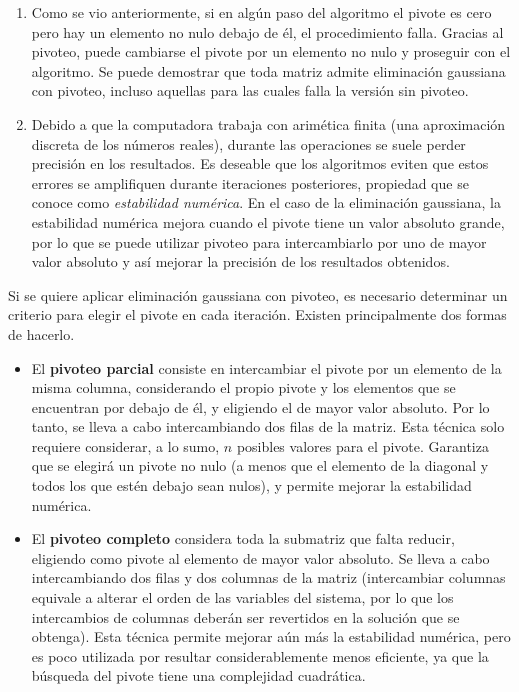 \begin{enumerate}
\item Como se vio anteriormente, si en algún paso del algoritmo el pivote
    es cero pero hay un elemento no nulo debajo de él, el procedimiento
    falla. Gracias al pivoteo, puede cambiarse el pivote por un elemento no
    nulo y proseguir con el algoritmo. Se puede demostrar que
    toda matriz admite eliminación gaussiana con pivoteo, incluso aquellas
    para las cuales falla la versión sin pivoteo.
\item Debido a que la computadora trabaja con arimética finita (una
    aproximación discreta de los números reales), durante las operaciones se
    suele perder precisión en los resultados. Es deseable que los algoritmos
    eviten que estos errores se amplifiquen durante iteraciones posteriores,
    propiedad que se conoce como \emph{estabilidad numérica}. En el caso de
    la eliminación gaussiana, la estabilidad numérica mejora cuando el
    pivote tiene un valor absoluto grande, por lo que se puede utilizar
    pivoteo para intercambiarlo por uno de mayor valor absoluto y así mejorar
    la precisión de los resultados obtenidos.
\end{enumerate}

Si se quiere aplicar eliminación gaussiana con pivoteo, es necesario
determinar un criterio para elegir el pivote en cada iteración. Existen
principalmente dos formas de hacerlo.
\begin{itemize}
\item El \textbf{pivoteo parcial} consiste en intercambiar el pivote por un
    elemento de la misma columna, considerando el propio pivote y los
    elementos que se encuentran por debajo de él, y eligiendo el de mayor
    valor absoluto. Por lo tanto, se lleva a cabo intercambiando dos filas de
    la matriz. Esta técnica solo requiere considerar, a lo sumo, $n$
    posibles valores para el pivote. Garantiza que se elegirá un pivote no
    nulo (a menos que el elemento de la diagonal y todos los que estén debajo
    sean nulos), y permite mejorar la estabilidad numérica.
\item El \textbf{pivoteo completo} considera toda la submatriz que falta
    reducir, eligiendo como pivote al elemento de mayor valor absoluto. Se
    lleva a cabo intercambiando dos filas y dos columnas de la matriz
    (intercambiar columnas equivale a alterar el orden de las variables del
    sistema, por lo que los intercambios de columnas deberán ser revertidos
    en la solución que se obtenga).
    Esta técnica permite mejorar aún más la estabilidad numérica, pero
    es poco utilizada por resultar considerablemente menos eficiente, ya que
    la búsqueda del pivote tiene una complejidad cuadrática.
\end{itemize}

